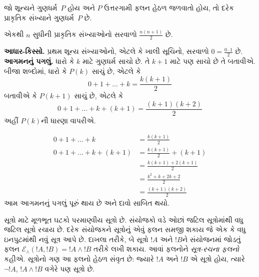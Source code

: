 \begin{defn}
જો શૂન્યને ગુણધર્મ~$P$ હોય અને $P$ ઉત્તરગામી ફલન હેઠળ
જળવાતો હોય, તો દરેક પ્રાકૃતિક સંખ્યાને ગુણધર્મ~$P$ છે.
\end{defn}

\begin{ex}
એકથી $n$ સુધીની પ્રાકૃતિક સંખ્યાઓનો સરવાળો
$\frac{n(n+1)}{2}$ છે. \\

\textbf{આધાર-કિસ્સો.} પ્રથમ શૂન્ય સંખ્યાઓનો, એટલે કે ખાલી
સૂચિનો, સરવાળો $0=
\frac{0\cdot 1}{2}$ છે.\\

\textbf{આગમનનું પગલું.} ધારો કે $k$ માટે ગુણધર્મ સાચો છે.
તે $k+1$ માટે પણ સાચો છે તે બતાવીએ.
બીજા શબ્દોમાં, ધારો કે $P(k)$ સાચું છે, એટલે કે
\[ 0 + 1 + \ldots + k = \frac{k(k+1)}{2} \]
બતાવીએ કે $P(k+1)$ સાચું છે, એટલે કે
\[ 0 + 1 + \ldots + k + (k+1) = \frac{(k+1)(k+2)}{2} \]
અહીં $P(k)$ની ધારણા વાપરીએ.

\begin{align*}
0 + 1 + \ldots + k &= \frac{k(k+1)}{2} \tag{ધારણા} \\
0 + 1 + \ldots + k + (k+1) &= \frac{k(k+1)}{2} + (k+1)
\tag{બંને બાજુએ $k+1$ ઉમેરો} \\
&= \frac{k(k+1) + 2(k+1)}{2} \\
&= \frac{k^2 + k + 2k +2}{2} \\
&=\frac{(k+1)(k+2)}{2}
\end{align*}
આમ આગમનનું પગલું પૂરું થાય છે અને દાવો સાબિત થયો.
\end{ex}

\begin{explain}
સૂત્રો માટે મૂળભૂત ઘટકો પરમાણ્વીય સૂત્રો છે.
સંયોજકો વડે ઓછાં જટિલ સૂત્રોમાંથી વધુ જટિલ
સૂત્રો રચાય છે. દરેક સંયોજકને સૂત્રોનું
એવું ફલન સમજી શકાય જે એક કે વધુ ઇનપુટમાંથી નવું
સૂત્ર આપે છે. દાખલા તરીકે, બે સૂત્રો
$!A$ અને $!B$ને સંયોજનમાં જોડતું ફલન
$\mathcal E _\land (!A,
!B) = !A \land !B$ તરીકે લખી શકાય.
આવાં ફલનોને \emph{સૂત્ર-રચના ફલનો} કહીએ.
સૂત્રોનો ગણ આ ફલનો હેઠળ સંવૃત છે:
જ્યારે $!A$ અને $!B$ એ સૂત્રો હોય, ત્યારે
$\lnot !A$, $!A \land !B$ વગેરે પણ સૂત્રો છે.
\end{explain}

